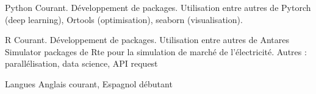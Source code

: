 

\begin{cvskills}

  \cvskill
    {Python} %
    {Courant. Développement de packages. Utilisation entre autres de Pytorch (deep learning), Ortools (optimisation), seaborn (visualisation).} %

  \cvskill
    {R} %
    {Courant. Développement de packages. Utilisation entre autres de Antares Simulator packages de Rte pour la simulation de marché de l'électricité. Autres : parallélisation, data science, API request} %

  \cvskill
  {Langues}
  {Anglais courant, Espagnol débutant}
  
\end{cvskills}
